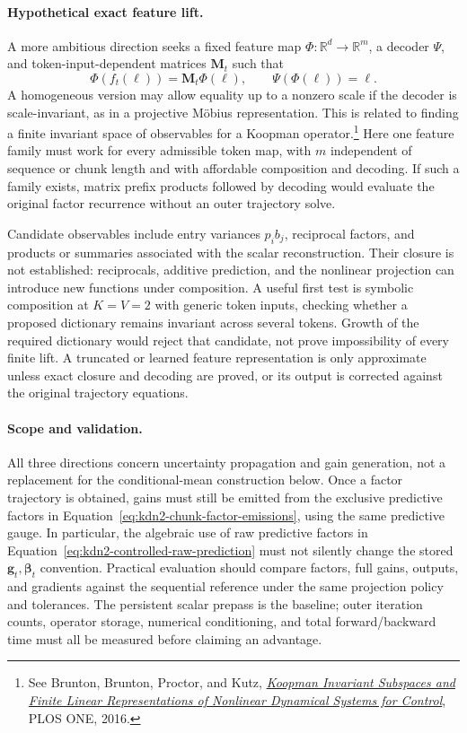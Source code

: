 \documentclass[11pt]{article}
\newcommand{\R}{\mathbb{R}}
\newcommand{\ve}[1]{\boldsymbol{#1}}
\begin{document}
\paragraph{Hypothetical exact feature lift.}
A more ambitious direction seeks a fixed feature map $\Phi:\R^d\to\R^m$, a decoder $\Psi$,
and token-input-dependent matrices $\ve{M}_t$ such that
\begin{equation}
  \Phi(f_t(\ve{\ell}))=\ve{M}_t\Phi(\ve{\ell}),
  \qquad
  \Psi(\Phi(\ve{\ell}))=\ve{\ell}.
  \label{eq:kdn2-factor-exact-lift}
\end{equation}
A homogeneous version may allow equality up to a nonzero scale if the decoder is
scale-invariant, as in a projective M\"obius representation.  This is related to finding a
finite invariant space of observables for a Koopman operator.\footnote{See Brunton, Brunton,
Proctor, and Kutz,
\href{https://doi.org/10.1371/journal.pone.0150171}{\emph{Koopman Invariant Subspaces and Finite
Linear Representations of Nonlinear Dynamical Systems for Control}}, PLOS ONE, 2016.}
Here one feature family must work for every admissible token map, with $m$ independent of
sequence or chunk length and with affordable composition and decoding.  If such a family
exists, matrix prefix products followed by decoding would evaluate the original factor
recurrence without an outer trajectory solve.

Candidate observables include entry variances $p_i b_j$, reciprocal factors, and products or
summaries associated with the scalar reconstruction.  Their closure is not established:
reciprocals, additive prediction, and the nonlinear projection can introduce new functions under
composition.  A useful first test is symbolic composition at $K=V=2$ with generic token inputs,
checking whether a proposed dictionary remains invariant across several tokens.  Growth of the
required dictionary would reject that candidate, not prove impossibility of every finite lift.
A truncated or learned feature representation is only approximate unless exact closure and
decoding are proved, or its output is corrected against the original trajectory equations.

\paragraph{Scope and validation.}
All three directions concern uncertainty propagation and gain generation, not a replacement
for the conditional-mean construction below.  Once a factor trajectory is obtained, gains must
still be emitted from the exclusive predictive factors in
Equation~\eqref{eq:kdn2-chunk-factor-emissions}, using the same predictive gauge.  In particular,
the algebraic use of raw predictive factors in
Equation~\eqref{eq:kdn2-controlled-raw-prediction} must not silently change the stored
$\ve{g}_t,\ve{\beta}_t$ convention.  Practical evaluation should compare factors, full gains,
outputs, and gradients against the sequential reference under the same projection policy and
tolerances.  The persistent scalar prepass is the baseline; outer iteration counts, operator
storage, numerical conditioning, and total forward/backward time must all be measured before
claiming an advantage.
\end{document}
